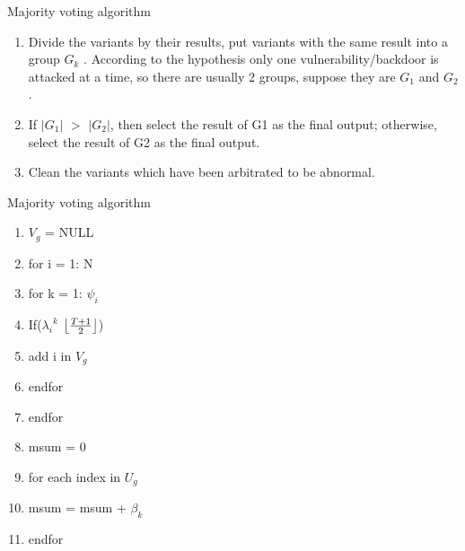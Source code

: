 \documentclass{beamer}
\DeclarePairedDelimiter\floor{\lfloor}{\rfloor}
\begin{document}
\begin{frame}{Majority voting algorithm}
    \begin{block}{}
        \begin{enumerate}
            \item Divide the variants by their results, put variants with the same result into a group $G_k$ . According to the hypothesis only one vulnerability/backdoor is attacked at a time, so there are usually 2 groups, suppose they are $G_1$ and $G_2$.
            \item If $\lvert G_1 \rvert$ $>$ $\lvert G_2 \rvert$, then select the result of G1 as the final output; otherwise, select the result of G2 as the final output.
            \item Clean the variants which have been arbitrated to be abnormal.
        \end{enumerate}
    \end{block}
\end{frame}
\begin{frame}{Majority voting algorithm}
    \begin{block}{}
        \begin{enumerate}
            \item $V_g$ = NULL
            \item for i = 1: N
            \item for k = 1: $\psi_i$
            \item If(${\lambda_i}^k$ \geq\:$\floor*{\frac{T+1}{2}}$)
            \item add i in $V_g$
            \item endfor
            \item endfor
            \item msum = 0
            \item for each index in $U_g$
            \item msum = msum + $\beta_k$
            \item endfor
        \end{enumerate}
    \end{block}
\end{frame}
\end{document}
